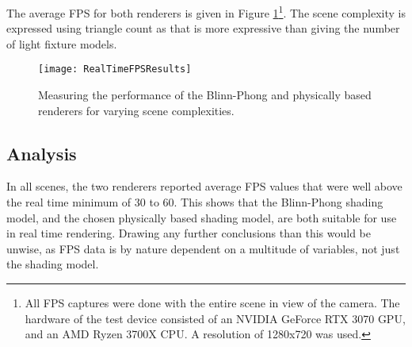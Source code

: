 The average FPS for both renderers is given in Figure \ref{fig:RealTimeFPSResults}\footnote{All FPS captures were done with the entire scene in view of the camera. The hardware of the test device consisted of an NVIDIA GeForce RTX 3070 GPU, and an AMD Ryzen 3700X CPU. A resolution of 1280x720 was used.}. The scene complexity is expressed using triangle count as that is more expressive than giving the number of light fixture models.

\begin{figure}[h]
	\centering
	\texttt{[image: RealTimeFPSResults]}
	\caption{Measuring the performance of the Blinn-Phong and physically based renderers for varying scene complexities.}
	\label{fig:RealTimeFPSResults}
\end{figure}

\subsection{Analysis}

In all scenes, the two renderers reported average FPS values that were well above the real time minimum of 30 to 60. This shows that the Blinn-Phong shading model, and the chosen physically based shading model, are both suitable for use in real time rendering. Drawing any further conclusions than this would be unwise, as FPS data is by nature dependent on a multitude of variables, not just the shading model.
